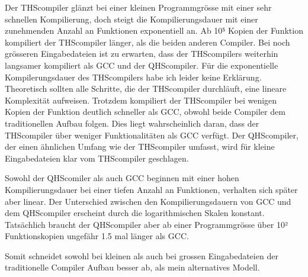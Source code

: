 Der THScompiler glänzt bei einer kleinen Programmgrösse mit einer sehr schnellen Kompilierung, doch steigt die Kompilierungsdauer mit einer zunehmenden Anzahl an Funktionen exponentiell an.
Ab 10⁵ Kopien der Funktion kompiliert der THScompiler länger, als die beiden anderen Compiler.
Bei noch grösseren Eingabedateien ist zu erwarten, dass der THScompilers weiterhin langsamer kompiliert als GCC und der QHScompiler.
Für die exponentielle Kompilerungsdauer des THScompilers habe ich leider keine Erklärung. Theoretisch sollten alle Schritte, die der THScompiler durchläuft, eine lineare Komplexität aufweisen.
Trotzdem kompiliert der THScompiler bei wenigen Kopien der Funktion deutlich schneller als GCC, obwohl beide Compiler dem traditionellen Aufbau folgen.
Dies liegt wahrscheinlich daran, dass der THScompiler über weniger Funktionalitäten als GCC verfügt.
Der QHScompiler, der einen ähnlichen Umfang wie der THScompiler umfasst, wird für kleine Eingabedateien klar vom THScompiler geschlagen.

Sowohl der QHScomiler als auch GCC beginnen mit einer hohen Kompilierungsdauer bei einer tiefen Anzahl an Funktionen, verhalten sich später aber linear.
Der Unterschied zwischen den Kompilierungsdauern von GCC und dem QHScompiler erscheint durch die logarithmischen Skalen konstant.
Tatsächlich braucht der QHScompiler aber ab einer Programmgrösse über 10² Funktionskopien ungefähr 1.5 mal länger als GCC. 

Somit schneidet sowohl bei kleinen als auch bei grossen Eingabedateien der traditionelle Compiler Aufbau besser ab, als mein alternatives Modell.


